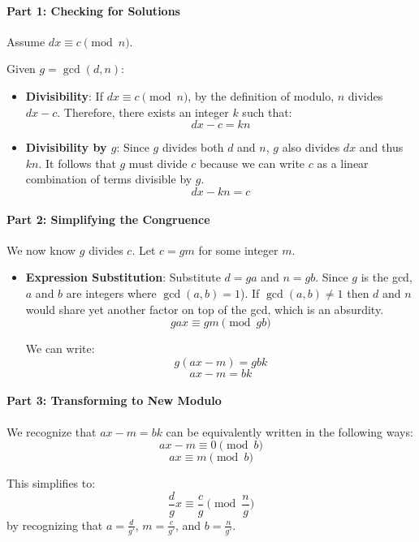 \documentclass{article}
\begin{document}
\paragraph{Part 1: Checking for Solutions}
Assume \( dx \equiv c \pmod{n} \).

Given \( g = \gcd(d, n) \):

\begin{itemize}
    \item \textbf{Divisibility}: If \( dx \equiv c \pmod{n} \), by the definition of modulo, \( n \) divides \( dx - c \). 
    Therefore, there exists an integer \( k \) such that:
    \[ dx - c = kn \]

    \item \textbf{Divisibility by \( g \)}: Since \( g \) divides both \( d \) and \( n \), \( g \) also divides \( dx \) and thus \( kn \). It follows that \( g \) must divide \( c \) because we can write $c$ as a linear combination of terms divisible by $g$.
        \[ dx - kn = c \] 

\end{itemize}

\paragraph{Part 2: Simplifying the Congruence}
We now know \( g \) divides \( c \). Let \( c = gm \) for some integer \( m \).

\begin{itemize}
    \item \textbf{Expression Substitution}: Substitute \( d = ga \) and \( n = gb \). Since \( g \) is the gcd, \( a \) and \( b \) are integers where \( \gcd(a, b) = 1 \)). If \( \gcd(a, b) \neq 1 \) then $d$ and $n$ would share yet another factor on top of the gcd, which is an absurdity.
    \[ gax \equiv gm \pmod{gb} \]

    We can write:
\[ g(ax - m) = gbk \]
\[ ax - m = bk \]
\end{itemize}

\paragraph{Part 3: Transforming to New Modulo}

We recognize that $ ax - m = bk $ can be equivalently written in the following ways: 
\[ax - m \equiv 0 \pmod{b}\]
\[ ax \equiv m \pmod{b} \]

This simplifies to:
\[ \frac{d}{g}x \equiv \frac{c}{g} \pmod{\frac{n}{g}} \]
by recognizing that $a = \frac{d}{g'}$, $m = \frac{c}{g'}$, and $b = \frac{n}{g'}$.
\end{document}
